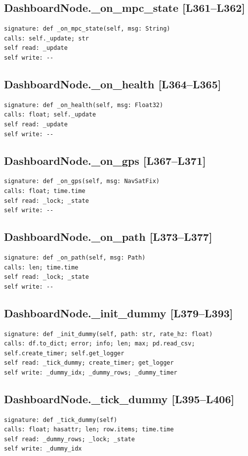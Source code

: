 \documentclass[a4paper,10pt,oneside]{book}
\begin{document}
\subsection*{DashboardNode.\_on\_mpc\_state [L361--L362]}
\begin{lstlisting}[numbers=none]
signature: def _on_mpc_state(self, msg: String)
calls: self._update; str
self read: _update
self write: --
\end{lstlisting}
\subsection*{DashboardNode.\_on\_health [L364--L365]}
\begin{lstlisting}[numbers=none]
signature: def _on_health(self, msg: Float32)
calls: float; self._update
self read: _update
self write: --
\end{lstlisting}
\subsection*{DashboardNode.\_on\_gps [L367--L371]}
\begin{lstlisting}[numbers=none]
signature: def _on_gps(self, msg: NavSatFix)
calls: float; time.time
self read: _lock; _state
self write: --
\end{lstlisting}
\subsection*{DashboardNode.\_on\_path [L373--L377]}
\begin{lstlisting}[numbers=none]
signature: def _on_path(self, msg: Path)
calls: len; time.time
self read: _lock; _state
self write: --
\end{lstlisting}
\subsection*{DashboardNode.\_init\_dummy [L379--L393]}
\begin{lstlisting}[numbers=none]
signature: def _init_dummy(self, path: str, rate_hz: float)
calls: df.to_dict; error; info; len; max; pd.read_csv; self.create_timer; self.get_logger
self read: _tick_dummy; create_timer; get_logger
self write: _dummy_idx; _dummy_rows; _dummy_timer
\end{lstlisting}
\subsection*{DashboardNode.\_tick\_dummy [L395--L406]}
\begin{lstlisting}[numbers=none]
signature: def _tick_dummy(self)
calls: float; hasattr; len; row.items; time.time
self read: _dummy_rows; _lock; _state
self write: _dummy_idx
\end{lstlisting}
\end{document}
